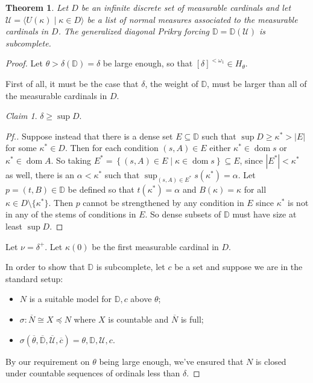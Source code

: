 \documentclass{amsart}
\newtheorem{theorem}{Theorem}[section]
\theoremstyle{definition}
\theoremstyle{remark}
\newtheorem{claimno}{Claim}
\newcommand{\D}{\mathbb{D}}
\newcommand{\N}{{\overline{N}}}
\newcommand{\U}{\mathcal{U}}
\DeclareMathOperator{\otp}{otp}
\DeclareMathOperator{\dom}{dom}
\newcommand{\st}{\; | \;}
\newcommand{\set}[2]{\left\{#1\st #2 \right\}}
\newcommand{\seq}[2]{\langle #1 \st #2 \rangle}
\begin{document}
\begin{theorem} \label{theorem:main} Let $D$ be an infinite discrete set of measurable cardinals %
and let $\U = \seq{ U(\kappa) }{\kappa \in D }$ be a list of normal measures associated to the
measurable cardinals in $D$. 
The generalized diagonal Prikry forcing $\D=\D(\U)$ is subcomplete. \end{theorem}
\begin{proof} 
Let $\theta > \delta(\D) =\delta$ be large enough, so that $[\delta]^{<\omega_1} \in H_\theta$. 

First of all, it must be the case that $\delta$, the weight of $\D$, must be larger than all of the measurable cardinals in $D$.
\begin{claimno} $\delta \geq \sup D$. \end{claimno}
\begin{proof}[Pf.] Suppose instead that there is a dense set $E \subseteq \D$ such that $\sup D \geq \kappa^* >|E|$ for some $\kappa^* \in D$. Then for each condition $(s,A) \in E$ either $\kappa^* \in \dom s$ or $\kappa^* \in \dom A$. So taking $E^*=\set{ (s, A) \in E }{ \kappa \in \dom s } \subseteq E$, since $|E^*| < \kappa^*$ as well, there is an $\alpha<\kappa^*$ such that $\sup_{(s,A) \in E^*} s(\kappa^*)=\alpha$. Let $p=(t, B) \in \D$ be defined so that $t(\kappa^*)=\alpha$ and $B(\kappa)=\kappa$ for all $\kappa \in D \setminus \{ \kappa^*\}$. Then $p$ cannot be strengthened by any condition in $E$ since $\kappa^*$ is not in any of the stems of conditions in $E$. So dense subsets of $\D$ must have size at least $\sup D$.\end{proof}

Let $\nu = \delta^+$. Let $\kappa(0)$ be the first measurable cardinal in $D$. %

In order to show that $\D$ is subcomplete, let $c$ be a set and suppose we are in the standard setup: \begin{itemize}
	\item $N$ is a suitable model for $\D, c$ above $\theta$;
	\item $\sigma: \N \cong X \preccurlyeq N$ where $X$ is countable and $\N$ is full;
	\item $\sigma(\overline \theta, \overline{\D}, \overline{\U}, \overline c)=\theta, \D, \U, c$.
\end{itemize}
By our requirement on $\theta$ being large enough, we've ensured that $N$ is closed under countable sequences of ordinals less than $\delta$.


\end{proof}
\end{document}
